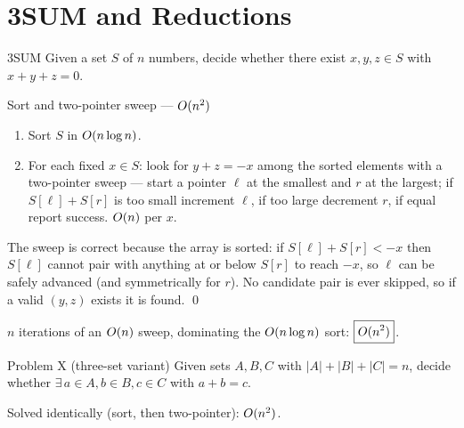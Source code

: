 \section{3SUM and Reductions}

\begin{prob}{3SUM}
Given a set $S$ of $n$ numbers, decide whether there exist $x,y,z\in S$ with $x+y+z=0$.
\end{prob}

\begin{algo}{Sort and two-pointer sweep --- $O(n^2)$}
\begin{enumerate}
  \item Sort $S$ in $O(n\log n)$.
  \item For each fixed $x\in S$: look for $y+z=-x$ among the sorted elements with a two-pointer
        sweep --- start a pointer $\ell$ at the smallest and $r$ at the largest; if
        $S[\ell]+S[r]$ is too small increment $\ell$, if too large decrement $r$, if equal
        report success. $O(n)$ per $x$.
\end{enumerate}
\end{algo}

\begin{correct}
The sweep is correct because the array is sorted: if $S[\ell]+S[r]<-x$ then $S[\ell]$ cannot pair
with anything at or below $S[r]$ to reach $-x$, so $\ell$ can be safely advanced (and symmetrically
for $r$). No candidate pair is ever skipped, so if a valid $(y,z)$ exists it is found. \qed
\end{correct}

\begin{cplx}
$n$ iterations of an $O(n)$ sweep, dominating the $O(n\log n)$ sort:
$\boxed{O(n^2)}$.
\end{cplx}

\begin{prob}{Problem X (three-set variant)}
Given sets $A,B,C$ with $|A|+|B|+|C|=n$, decide whether $\exists\,a\in A,b\in B,c\in C$ with
$a+b=c$.
\end{prob}

\noindent Solved identically (sort, then two-pointer): $O(n^2)$.

